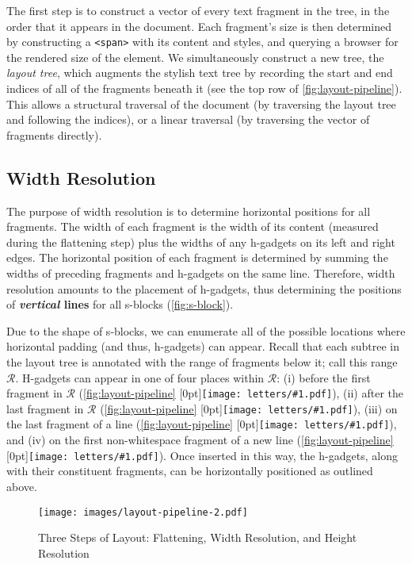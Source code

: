 \documentclass[acmsmall, screen]{acmart}
\newcommand{\caseBubble}[1]{\raisebox{-0.03in}[0pt]{\texttt{[image: letters/\#1.pdf]}}}
\begin{document}
The first step is to construct a vector of every text fragment in the tree, in the order that it appears in the document.
Each fragment's size is then determined by constructing a \texttt{<span>} with its content and styles, and querying a browser for the rendered size of the element.
We simultaneously construct a new tree, the \textit{layout tree}, which augments the stylish text tree by recording the start and end indices of all of the fragments beneath it (see the top row of \autoref{fig:layout-pipeline}).
This allows a structural traversal of the document (by traversing the layout tree and following the indices), or a linear traversal (by traversing the vector of fragments directly).




\subsection{Width Resolution}

The purpose of width resolution is to determine horizontal positions for all fragments. The width of each fragment is the width of its content (measured during the flattening step) plus the widths of any h-gadgets on its left and right edges.
The horizontal position of each fragment is determined by summing the widths of preceding fragments and h-gadgets on the same line.
Therefore, width resolution amounts to the placement of h-gadgets, thus
determining the positions of \textbf{\textit{vertical} lines} for all s-blocks (\autoref{fig:s-block}).

Due to the shape of s-blocks, we can enumerate all of the possible locations where horizontal padding (and thus, h-gadgets) can appear.
Recall that each subtree in the layout tree is annotated with the range of fragments below it; call this range $\mathcal{R}$.
H-gadgets can appear in one of four places within $\mathcal{R}$:
(i) before the first fragment in $\mathcal{R}$ (\autoref{fig:layout-pipeline} \caseBubble{w1}),
(ii) after the last fragment in $\mathcal{R}$ (\autoref{fig:layout-pipeline} \caseBubble{w1}),
(iii) on the last fragment of a line (\autoref{fig:layout-pipeline} \caseBubble{w2}),
and (iv) on the first non-whitespace fragment of a new line (\autoref{fig:layout-pipeline} \caseBubble{w2}).
Once inserted in this way, the h-gadgets, along with their constituent fragments, can be horizontally positioned as outlined above.


\begin{figure} \texttt{[image: images/layout-pipeline-2.pdf]}
  \caption{
  Three Steps of Layout: Flattening, Width Resolution, and Height Resolution
}
\label{fig:layout-pipeline}
\end{figure}
 
\end{document}
